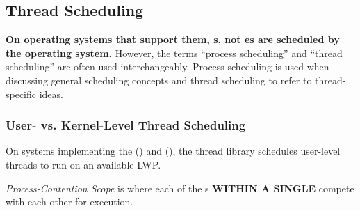 \subsection{Thread Scheduling}\label{subsec:Thread_Scheduling}
\begin{blackbox}
  \textbf{On operating systems that support them, s, not es are scheduled by the operating system.}
  However, the terms ``process scheduling'' and ``thread scheduling'' are often used interchangeably.
  Process scheduling is used when discussing general scheduling concepts and thread scheduling to refer to thread-specific ideas.
\end{blackbox}

\subsubsection{User- vs. Kernel-Level Thread Scheduling}\label{subsubsec:User_vs_Kernel_Thread_Scheduling}
On systems implementing the  () and  (), the thread library schedules user-level threads to run on an available LWP.\@

\begin{definition}\label{def:Process_Contention_Scope}
  \emph{Process-Contention Scope} is where each of the s \textbf{WITHIN A SINGLE } compete with each other for execution.
\end{definition}


